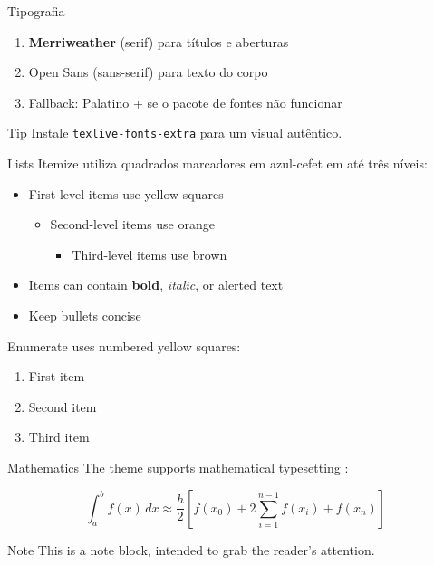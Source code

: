 \documentclass[aspectratio=169,10pt]{beamer}
\begin{document}
\begin{frame}{Tipografia}
  \begin{enumerate}
    \item \textbf{Merriweather} (serif) para títulos e aberturas
    \item \textsf{Open Sans} (sans-serif) para texto do corpo
    \item Fallback: Palatino + se o pacote de fontes não funcionar
  \end{enumerate}

  \vskip 10pt
  \begin{exampleblock}{Tip}
    Instale \texttt{texlive-fonts-extra} para um visual autêntico.
  \end{exampleblock}
\end{frame}

\begin{frame}{Lists}
  Itemize utiliza quadrados marcadores em azul-cefet em até três níveis:

  \begin{itemize}
    \item First-level items use \textcolor{DCblue}{yellow} squares
    \begin{itemize}
      \item Second-level items use \textcolor{DCorange}{orange}
      \begin{itemize}
        \item Third-level items use \textcolor{DCbrown}{brown}
      \end{itemize}
    \end{itemize}
    \item Items can contain \textbf{bold}, \emph{italic}, or \alert{alerted} text
    \item Keep bullets concise
  \end{itemize}

  \vskip 8pt
  Enumerate uses numbered yellow squares:
  \begin{enumerate}
    \item First item
    \item Second item
    \item Third item
  \end{enumerate}
\end{frame}

\begin{frame}{Mathematics}
  The theme supports mathematical typesetting \cite{tai1994mathematical}:

$$
\int_{a}^{b} f(x)\,dx \approx
\frac{h}{2}\left[f(x_0) + 2\sum_{i=1}^{n-1} f(x_i) + f(x_n)\right]
$$

  \begin{alertblock}{Note}
    This is a note block, intended to grab the reader's attention.
  \end{alertblock}
\end{frame}
\end{document}
